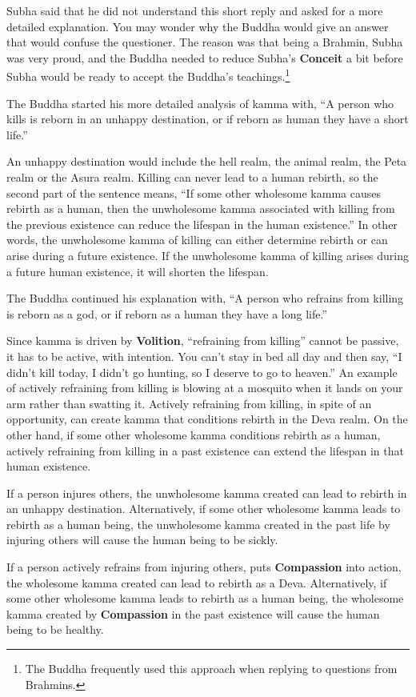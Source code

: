 Subha said that he did not understand this short reply and asked for a more detailed explanation. You may wonder why the Buddha would give an answer that would confuse the questioner. The reason was that being a Brahmin, Subha was very proud, and the Buddha needed to reduce Subha’s \textbf{Conceit} a bit before Subha would be ready to accept the Buddha’s teachings.\footnote{The Buddha frequently used this approach when replying to questions from Brahmins.}

The Buddha started his more detailed analysis of kamma with, “A person who kills is reborn in an unhappy destination, or if reborn as human they have a short life.” 

An unhappy destination would include the hell realm, the animal realm, the Peta realm or the Asura realm. Killing can never lead to a human rebirth, so the second part of the sentence means, “If some other wholesome kamma causes rebirth as a human, then the unwholesome kamma associated with killing from the previous existence can reduce the lifespan in the human existence.” In other words, the unwholesome kamma of killing can either determine rebirth or can arise during a future existence. If the unwholesome kamma of killing arises during a future human existence, it will shorten the lifespan.

The Buddha continued his explanation with, “A person who refrains from killing is reborn as a god, or if reborn as a human they have a long life.” 

Since kamma is driven by \textbf{Volition}, “refraining from killing” cannot be passive, it has to be active, with intention. You can’t stay in bed all day and then say, “I didn’t kill today, I didn’t go hunting, so I deserve to go to heaven.” An example of actively refraining from killing is blowing at a mosquito when it lands on your arm rather than swatting it. Actively refraining from killing, in spite of an opportunity, can create kamma that conditions rebirth in the Deva realm. On the other hand, if some other wholesome kamma conditions rebirth as a human, actively refraining from killing in a past existence can extend the lifespan in that human existence.

If a person injures others, the unwholesome kamma created can lead to rebirth in an unhappy destination. Alternatively, if some other wholesome kamma leads to rebirth as a human being, the unwholesome kamma created in the past life by injuring others will cause the human being to be sickly. 

If a person actively refrains from injuring others, puts \textbf{Compassion} into action, the wholesome kamma created can lead to rebirth as a Deva. Alternatively, if some other wholesome kamma leads to rebirth as a human being, the wholesome kamma created by \textbf{Compassion} in the past existence will cause the human being to be healthy.

